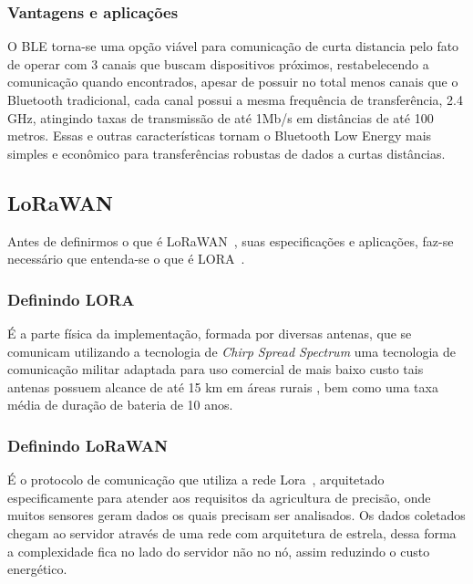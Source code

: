 \documentclass[
article,			%
12pt,				%
oneside,			%
a4paper,			%
english,			%
brazil,				%
sumario=tradicional
]{abntex2}
\begin{document}
\subsubsection{Vantagens e aplicações}\label{Vantagens e aplicações}
O BLE torna-se uma opção viável para comunicação de curta distancia pelo fato de operar com 3 canais\cite{ble} que buscam dispositivos próximos, restabelecendo a comunicação quando encontrados, apesar de possuir no total menos canais que o Bluetooth tradicional, cada canal possui a mesma frequência de transferência, 2.4 GHz, atingindo taxas de transmissão de até 1Mb/s\cite{5} em distâncias de até 100 metros\cite{5}. Essas e outras características tornam o Bluetooth Low Energy mais simples e econômico para transferências robustas de dados a curtas distâncias\cite{ble}.

\subsection{LoRaWAN~\texttrademark}\label{LoRaWAN}
Antes de definirmos o que é LoRaWAN~\texttrademark, suas especificações e aplicações, faz-se necessário que entenda-se o que é LORA~\textregistered.

\subsubsection{Definindo LORA~\textregistered}\label{Definindo LORA}
É a parte física da implementação, formada por diversas antenas\cite{siteLorawan}, que se comunicam utilizando a tecnologia de \textit{Chirp Spread Spectrum}\cite{lorawan} uma tecnologia de comunicação militar adaptada para uso comercial de mais baixo custo\cite{siteLorawan} tais antenas possuem alcance de até 15 km em áreas rurais %
\cite{limiteLora}, bem como uma taxa média de duração de bateria de 10 anos\cite{limiteLora}.

\subsubsection{Definindo LoRaWAN~\texttrademark}\label{Definindo LoRaWAN}

É o protocolo de comunicação que utiliza a rede Lora~\textregistered\cite{siteLorawan}, arquitetado especificamente para atender aos requisitos da agricultura de precisão, onde muitos sensores geram dados os quais precisam ser analisados\cite{lorawan}. Os dados coletados chegam ao servidor através de uma rede com arquitetura de estrela\cite{siteLorawan}, dessa forma a complexidade fica no lado do servidor não no nó, assim reduzindo o custo energético.
\end{document}
